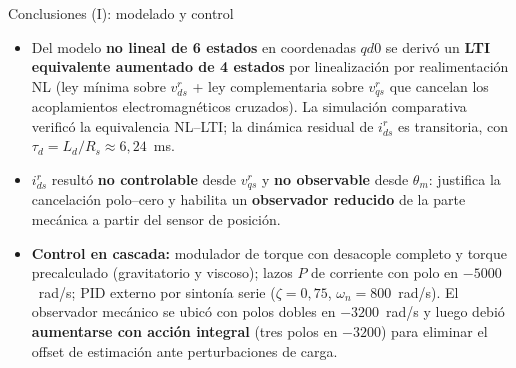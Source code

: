 \documentclass[aspectratio=169,t]{beamer}
\begin{document}
\begin{frame}{Conclusiones (I): modelado y control}
\begin{itemize}\small
\item Del modelo \textbf{no lineal de 6 estados} en coordenadas $qd0$ se derivó un \textbf{LTI equivalente aumentado de 4 estados} por linealización por realimentación NL (ley mínima sobre $v_{ds}^{r}$ + ley complementaria sobre $v_{qs}^{r}$ que cancelan los acoplamientos electromagnéticos cruzados). La simulación comparativa verificó la equivalencia NL–LTI; la dinámica residual de $i_{ds}^{r}$ es transitoria, con $\tau_d = L_d/R_s \approx 6{,}24$~ms.
\item $i_{ds}^{r}$ resultó \textbf{no controlable} desde $v_{qs}^{r}$ y \textbf{no observable} desde $\theta_m$: justifica la cancelación polo–cero y habilita un \textbf{observador reducido} de la parte mecánica a partir del sensor de posición.
\item \textbf{Control en cascada:} modulador de torque con desacople completo y torque precalculado (gravitatorio y viscoso); lazos $P$ de corriente con polo en $-5000$~rad/s; PID externo por sintonía serie ($\zeta=0{,}75$, $\omega_n=800$~rad/s). El observador mecánico se ubicó con polos dobles en $-3200$~rad/s y luego debió \textbf{aumentarse con acción integral} (tres polos en $-3200$) para eliminar el offset de estimación ante perturbaciones de carga.
\end{itemize}
\end{frame}
\end{document}

